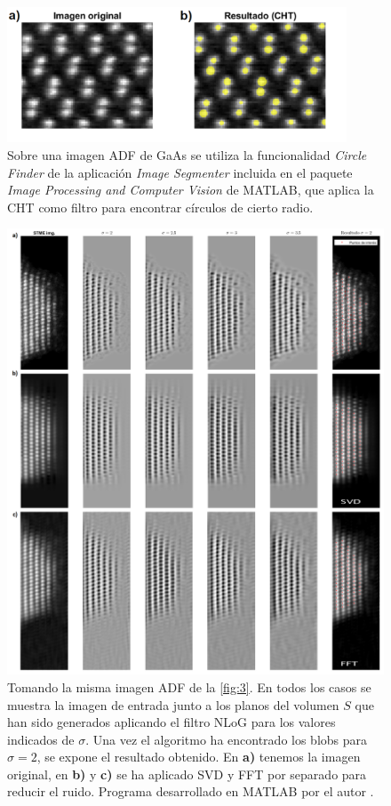 \begin{figure}[h!]
    \centering
    \includegraphics[width=0.9\textwidth]{fig/Fig6.png}
    \caption{Sobre una imagen ADF de GaAs \cite{maria} se utiliza la funcionalidad \textit{Circle Finder} de la aplicación \textit{Image Segmenter} incluida en el paquete \textit{Image Processing and Computer Vision} de MATLAB, que aplica la CHT \cite{matlab_circulos} como filtro para encontrar círculos de cierto radio.}
    \label{fig:6}
\end{figure}

\newpage
\begin{figure}[h!]
    \centering
    \includegraphics[width=1\textwidth]{fig/Fig7.png}
    \caption{Tomando la misma imagen ADF de la \autoref{fig:3}. En todos los casos se muestra la imagen de entrada junto a los planos del volumen $S$ que han sido generados aplicando el filtro NLoG para los valores indicados de $\sigma$. Una vez el algoritmo ha encontrado los blobs para $\sigma = 2$, se expone el resultado obtenido. En \textbf{a)} tenemos la imagen original, en \textbf{b)} y \textbf{c)} se ha aplicado SVD y FFT por separado para reducir el ruido. Programa desarrollado en MATLAB por el autor \cite{repo}.}
    \label{fig:7}
\end{figure}

